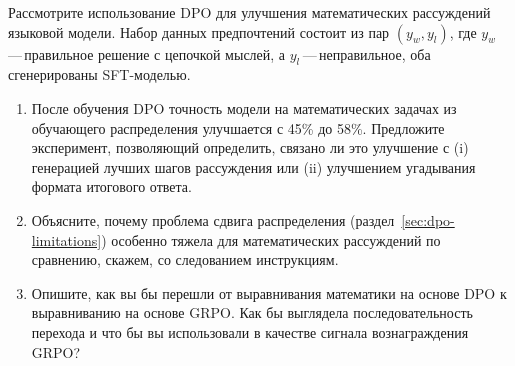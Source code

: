 \begin{exercise}
\label{ex:dpo-math-reasoning}
Рассмотрите использование DPO для улучшения математических рассуждений языковой модели. Набор данных предпочтений состоит из пар $(y_w, y_l)$, где $y_w$\,---\,правильное решение с цепочкой мыслей, а $y_l$\,---\,неправильное, оба сгенерированы SFT-моделью.
\begin{enumerate}
  \item После обучения DPO точность модели на математических задачах из обучающего распределения улучшается с 45\% до 58\%. Предложите эксперимент, позволяющий определить, связано ли это улучшение с (i) генерацией лучших шагов рассуждения или (ii) улучшением угадывания формата итогового ответа.
  \item Объясните, почему проблема сдвига распределения (раздел~\ref{sec:dpo-limitations}) особенно тяжела для математических рассуждений по сравнению, скажем, со следованием инструкциям.
  \item Опишите, как вы бы перешли от выравнивания математики на основе DPO к выравниванию на основе GRPO. Как бы выглядела последовательность перехода и что бы вы использовали в качестве сигнала вознаграждения GRPO?
\end{enumerate}
\end{exercise}
